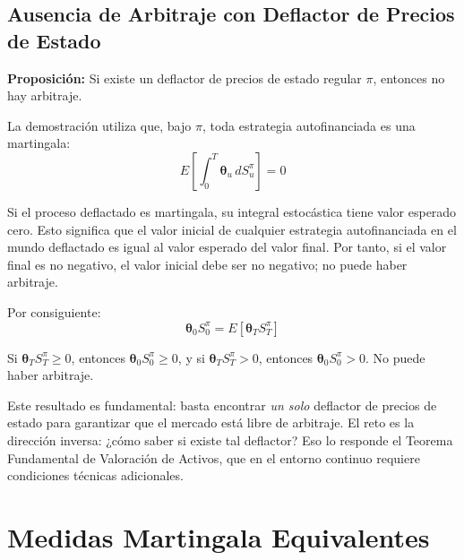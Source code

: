 \documentclass[12pt]{article}
\begin{document}
\subsection{Ausencia de Arbitraje con Deflactor de Precios de Estado}

\textbf{Proposici\'on:} Si existe un deflactor de precios de estado regular $\pi$, entonces no hay arbitraje.

La demostraci\'on utiliza que, bajo $\pi$, toda estrategia autofinanciada es una martingala:
\begin{equation}
  E\!\left[\int_0^T \boldsymbol{\theta}_u \, dS_u^\pi\right] = 0
\end{equation}

\begin{intuicionmat}
Si el proceso deflactado es martingala, su integral estoc\'astica tiene valor esperado cero. Esto significa que el valor inicial de cualquier estrategia autofinanciada en el mundo deflactado es igual al valor esperado del valor final. Por tanto, si el valor final es no negativo, el valor inicial debe ser no negativo; no puede haber arbitraje.
\end{intuicionmat}

Por consiguiente:
\begin{equation}
  \boldsymbol{\theta}_0 S_0^\pi = E[\boldsymbol{\theta}_T S_T^\pi]
\end{equation}

Si $\boldsymbol{\theta}_T S_T^\pi \geq 0$, entonces $\boldsymbol{\theta}_0 S_0^\pi \geq 0$, y si $\boldsymbol{\theta}_T S_T^\pi > 0$, entonces $\boldsymbol{\theta}_0 S_0^\pi > 0$. No puede haber arbitraje.

\begin{intuicion}
Este resultado es fundamental: basta encontrar \textit{un solo} deflactor de precios de estado para garantizar que el mercado est\'a libre de arbitraje. El reto es la direcci\'on inversa: ¿c\'omo saber si existe tal deflactor? Eso lo responde el Teorema Fundamental de Valoraci\'on de Activos, que en el entorno continuo requiere condiciones t\'ecnicas adicionales.
\end{intuicion}

\section{Medidas Martingala Equivalentes}
\end{document}
